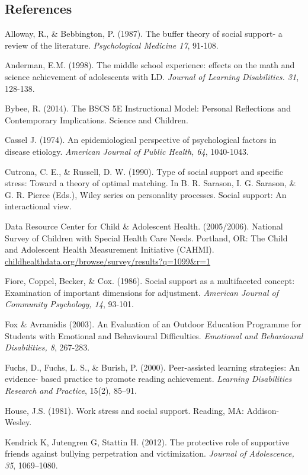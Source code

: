 \documentclass[11pt]{sig-alternate}
\begin{document}
\begin{large}
\section*{References}\par 

\leftskip 0.25in
\parindent -0.25in 
Alloway, R., \& Bebbington, P. (1987). The buffer theory of social support- a review of the 
literature. \textit{Psychological Medicine 17}, 91-108.

Anderman, E.M. (1998). The middle school experience: effects on the math and science 
achievement of adolescents with LD. \textit{Journal of Learning Disabilities. 31}, 128-138.

Bybee, R. (2014). The BSCS 5E Instructional Model: Personal Reflections and Contemporary
Implications. Science and Children.

Cassel J. (1974). An epidemiological perspective of psychological factors in disease etiology. 
\textit{American Journal of Public Health, 64}, 1040-1043.

Cutrona, C. E., \& Russell, D. W. (1990). Type of social support and specific stress: Toward a 
theory of optimal matching. In B. R. Sarason, I. G. Sarason, \& G. R. Pierce (Eds.), Wiley series on personality processes. Social support: An interactional view.

Data Resource Center for Child \& Adolescent Health. (2005/2006). National Survey of Children 
with Special Health Care Needs. Portland, OR: The Child and Adolescent Health Measurement Initiative (CAHMI). \url{childhealthdata.org/browse/survey/results?q=1099\&r=1}

Fiore, Coppel, Becker, \& Cox. (1986). Social support as a multifaceted concept: Examination of 
important dimensions for adjustment. \textit{American Journal of Community Psychology, 14}, 93-101.

Fox \& Avramidis (2003). An Evaluation of an Outdoor Education Programme for Students with 
Emotional and Behavioural Difficulties. \textit{Emotional and Behavioural Disabilities, 8}, 267-283.

Fuchs, D., Fuchs, L. S., \& Burish, P. (2000). Peer-assisted learning strategies: An evidence-
based practice to promote reading achievement.\textit{ Learning Disabilities Research and Practice}, 15(2), 85–91.

House, J.S. (1981). Work stress and social support. Reading, MA: Addison-Wesley.

Kendrick K, Jutengren G, Stattin H. (2012). The protective role of supportive friends against 
bullying perpetration and victimization.\textit{ Journal of Adolescence, 35}, 1069–1080.


\end{large}
\end{document}
